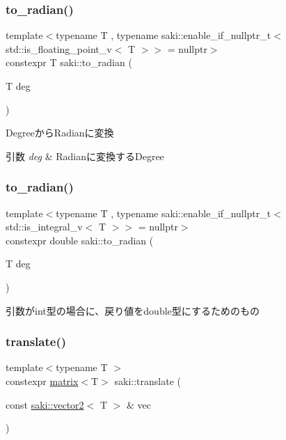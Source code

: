 \subsubsection{\texorpdfstring{to\+\_\+radian()}{to\_radian()}\hspace{0.1cm}{\footnotesize\ttfamily [1/2]}}
{\footnotesize\ttfamily template$<$typename T , typename saki\+::enable\+\_\+if\+\_\+nullptr\+\_\+t$<$ std\+::is\+\_\+floating\+\_\+point\+\_\+v$<$ T $>$$>$  = nullptr$>$ \\
constexpr T saki\+::to\+\_\+radian (\begin{DoxyParamCaption}\item[{T}]{deg }\end{DoxyParamCaption})}



Degreeから\+Radianに変換 


\begin{DoxyParams}{引数}
{\em deg} & Radianに変換する\+Degree \\
\hline
\end{DoxyParams}
\mbox{\label{namespacesaki_aa671d122197cf10439eee0d271f51fe6}} 
\subsubsection{\texorpdfstring{to\+\_\+radian()}{to\_radian()}\hspace{0.1cm}{\footnotesize\ttfamily [2/2]}}
{\footnotesize\ttfamily template$<$typename T , typename saki\+::enable\+\_\+if\+\_\+nullptr\+\_\+t$<$ std\+::is\+\_\+integral\+\_\+v$<$ T $>$$>$  = nullptr$>$ \\
constexpr double saki\+::to\+\_\+radian (\begin{DoxyParamCaption}\item[{T}]{deg }\end{DoxyParamCaption})}



引数がint型の場合に、戻り値をdouble型にするためのもの 

\mbox{\label{namespacesaki_a2311e77a2bed9d914a6b3e8056d6023a}} 
\subsubsection{\texorpdfstring{translate()}{translate()}\hspace{0.1cm}{\footnotesize\ttfamily [1/3]}}
{\footnotesize\ttfamily template$<$typename T $>$ \\
constexpr \mbox{\hyperlink{classsaki_1_1matrix}{matrix}}$<$T$>$ saki\+::translate (\begin{DoxyParamCaption}\item[{const \mbox{\hyperlink{classsaki_1_1vector2}{saki\+::vector2}}$<$ T $>$ \&}]{vec }\end{DoxyParamCaption})}



